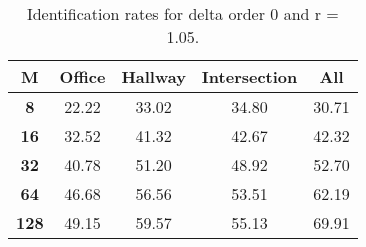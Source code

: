 \begin{table}[h]
    \small
    \centering
    \begin{tabular}{|c|c|c|c|l|}    
    \hline
    {\bf M} & {\bf Office} & {\bf Hallway} & {\bf Intersection} &     \multicolumn{1}{c|}{{\bf All}} \\ \hline
    {\bf 8} & 22.22 & 33.02 & 34.80 & 30.71 \\ \hline
    {\bf 16} & 32.52 & 41.32 & 42.67 & 42.32 \\ \hline
    {\bf 32} & 40.78 & 51.20 & 48.92 & 52.70 \\ \hline
    {\bf 64} & 46.68 & 56.56 & 53.51 & 62.19 \\ \hline
    {\bf 128} & 49.15 & 59.57 & 55.13 & 69.91 \\ \hline
    \end{tabular}
    \caption{Identification rates for delta order 0 and r = 1.05.}    
    \label{tab:identify_speakers_1.05_mit_19_0}
\end{table}

